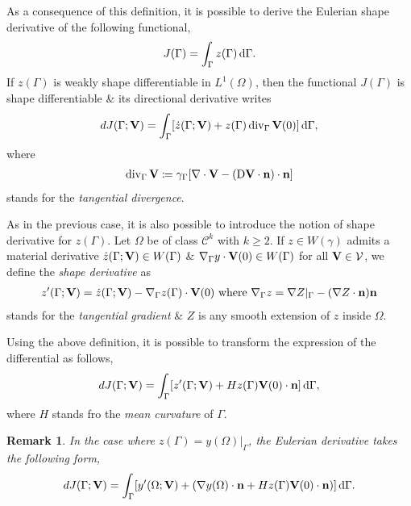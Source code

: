\documentclass[oneside]{book}
\numberwithin{equation}{section}
\newtheorem{remark}{Remark}[chapter]
\begin{document}
As a consequence of this definition, it is possible to derive the Eulerian shape derivative of the following functional,
\begin{align*}
	J(\Gamma) = \int_\Gamma z(\Gamma)\,{\rm d}\Gamma.
\end{align*}
If $z(\Gamma)$ is weakly shape differentiable in $L^1(\Omega)$, then the functional $J(\Gamma)$ is shape differentiable \& its directional derivative writes
\begin{align*}
	dJ(\Gamma;{\bf V}) = \int_\Gamma [\dot{z}(\Gamma;{\bf V}) + z(\Gamma)\operatorname{div}_\Gamma{\bf V}(0)]\,{\rm d}\Gamma,
\end{align*}
where
\begin{align*}
	\operatorname{div}_\Gamma{\bf V}\coloneqq\gamma_\Gamma[\nabla\cdot{\bf V} - ({\rm D}{\bf V}\cdot{\bf n})\cdot{\bf n}]
\end{align*}
stands for the \textit{tangential divergence}.

As in the previous case, it is also possible to introduce the notion of shape derivative for $z(\Gamma)$. Let $\Omega$ be of class $\mathcal{C}^k$ with $k\ge 2$. If $z\in W(\gamma)$ admits a material derivative $\dot{z}(\Gamma;{\bf V})\in W(\Gamma)$ \& $\nabla_\Gamma y\cdot{\bf V}(0)\in W(\Gamma)$ for all ${\bf V}\in\mathcal{V}$, we define the \textit{shape derivative} as
\begin{align*}
	z'(\Gamma;{\bf V}) = \dot{z}(\Gamma;{\bf V}) - \nabla_\Gamma z(\Gamma)\cdot{\bf V}(0)\mbox{ where }\nabla_\Gamma z = \nabla Z|_\Gamma - (\nabla Z\cdot{\bf n}){\bf n}
\end{align*}
stands for the \textit{tangential gradient} \& $Z$ is any smooth extension of $z$ inside $\Omega$.

Using the above definition, it is possible to transform the expression of the differential as follows,
\begin{align*}
	dJ(\Gamma;{\bf V}) = \int_\Gamma [z'(\Gamma;{\bf V}) + Hz(\Gamma){\bf V}(0)\cdot{\bf n}]\,{\rm d}\Gamma,
\end{align*}
where $H$ stands fro the \textit{mean curvature} of $\Gamma$.

\begin{remark}
	In the case where $z(\Gamma) = y(\Omega)|_\Gamma$, the Eulerian derivative takes the following form,
	\begin{align*}
		dJ(\Gamma;{\bf V}) = \int_\Gamma [y'(\Omega;{\bf V}) + (\nabla y(\Omega)\cdot{\bf n} + Hz(\Gamma){\bf V}(0)\cdot{\bf n})]\,{\rm d}\Gamma.
	\end{align*}
\end{remark}
\end{document}
